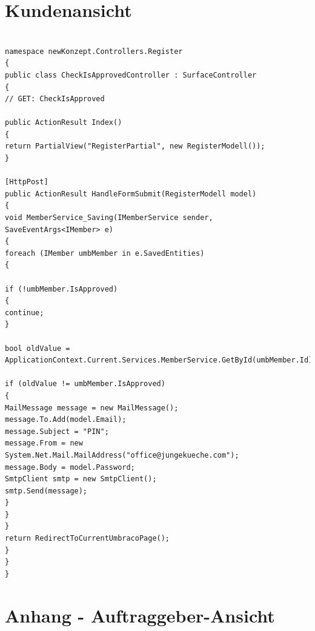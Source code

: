 \section{Kundenansicht}
\begin{lstlisting}[caption={Class E-Mail zum Kunde schicken}, label=lst:EmailSchicken]

namespace newKonzept.Controllers.Register
{
public class CheckIsApprovedController : SurfaceController
{
// GET: CheckIsApproved

public ActionResult Index()
{
return PartialView("RegisterPartial", new RegisterModell());
}		

[HttpPost]
public ActionResult HandleFormSubmit(RegisterModell model)
{
void MemberService_Saving(IMemberService sender, SaveEventArgs<IMember> e)
{
foreach (IMember umbMember in e.SavedEntities)
{

if (!umbMember.IsApproved)
{
continue;
}

bool oldValue = ApplicationContext.Current.Services.MemberService.GetById(umbMember.Id).IsApproved;

if (oldValue != umbMember.IsApproved)
{
MailMessage message = new MailMessage();
message.To.Add(model.Email);
message.Subject = "PIN";
message.From = new System.Net.Mail.MailAddress("office@jungekueche.com");
message.Body = model.Password;
SmtpClient smtp = new SmtpClient();
smtp.Send(message);
}
}
}
return RedirectToCurrentUmbracoPage();
}
}
}
\end{lstlisting}

\newpage
\section{Anhang - Auftraggeber-Ansicht}

